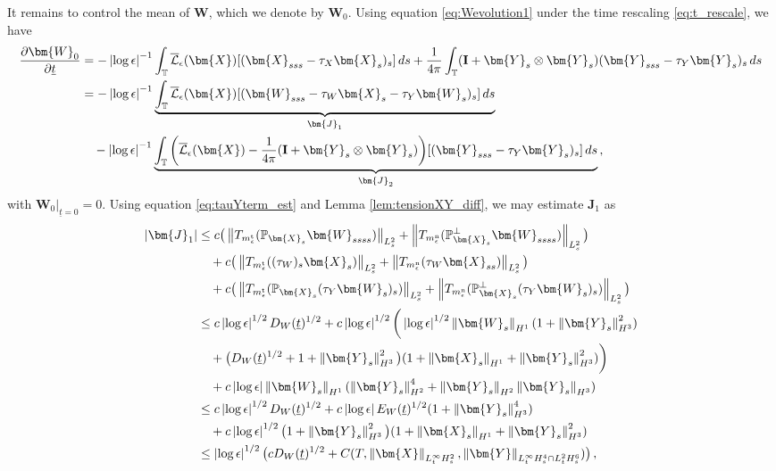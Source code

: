 \documentclass[11pt,reqno]{amsart}
\newcommand{\T}{\mathbb{T}}
\renewcommand{\P}{\mathbb{P}}
\newcommand{\X}{\bm{X}}
\newcommand{\Y}{\bm{Y}}
\newcommand{\p}{\partial}
\newcommand{\abs}[1]{\left\lvert #1 \right\rvert}
\newcommand{\norm}[1]{\left\lVert #1 \right\rVert}
\newcommand{\mc}[1]{\mathcal{#1}}
\numberwithin{equation}{section}
\theoremstyle{definition}
\begin{document}
It remains to control the mean of $\bm{W}$, which we denote by $\bm{W}_0$. Using equation \eqref{eq:Wevolution1} under the time rescaling \eqref{eq:t_rescale}, we have
\begin{equation}
\begin{aligned}
  \frac{\p\bm{W}_0}{\p \underline{t}} &= -\abs{\log\epsilon}^{-1}\int_\T\overline{\mc{L}}_\epsilon(\X)[(\X_{sss}-\tau_X\X_s)_s]\,ds
  + \frac{1}{4\pi}\int_\T ({\bf I}+\Y_s\otimes\Y_s)(\Y_{sss}-\tau_Y\Y_s)_s\,ds\\
  &= -\abs{\log\epsilon}^{-1}\underbrace{\int_\T\overline{\mc{L}}_\epsilon(\X)[(\bm{W}_{sss}-\tau_W\X_s-\tau_Y\bm{W}_s)_s]\,ds}_{\bm{J}_1}\\
  &\quad -\abs{\log\epsilon}^{-1}\underbrace{\int_\T\bigg(\overline{\mc{L}}_\epsilon(\X)-\frac{1}{4\pi}({\bf I}+\Y_s\otimes\Y_s)\bigg)[(\Y_{sss} -\tau_Y\Y_s)_s]\,ds}_{\bm{J}_2}\,,
\end{aligned}
\end{equation}
with $\bm{W}_0\big|_{\underline{t}=0}=0$. Using equation \eqref{eq:tauYterm_est} and Lemma \ref{lem:tensionXY_diff}, we may estimate $\bm{J}_1$ as 
\begin{equation}
\begin{aligned}
  \abs{\bm{J}_1} &\le c\big(\norm{T_{m_\epsilon^{\rm t}}(\P_{\X_s}\bm{W}_{ssss})}_{L^2_s} + \norm{T_{m_\epsilon^{\rm n}}(\P_{\X_s}^\perp\bm{W}_{ssss})}_{L^2_s}\big)\\
  &\quad + c\big(\norm{T_{m_\epsilon^{\rm t}}((\tau_W)_s\X_s)}_{L^2_s} + \norm{T_{m_\epsilon^{\rm n}}(\tau_W\X_{ss})}_{L^2_s}\big)\\
  &\quad + c\big(\norm{T_{m_\epsilon^{\rm t}}(\P_{\X_s}(\tau_Y\bm{W}_s)_s)}_{L^2_s} + \norm{T_{m_\epsilon^{\rm n}}(\P_{\X_s}^\perp(\tau_Y\bm{W}_s)_s)}_{L^2_s}\big)\\
  &\le c\abs{\log\epsilon}^{1/2}D_W(\underline{t})^{1/2}
  + c\abs{\log\epsilon}^{1/2}\bigg(\abs{\log\epsilon}^{1/2}\norm{\bm{W}_s}_{H^1}(1+\norm{\Y_s}_{H^3}^2)\\
  &\quad + \big(D_W(\underline{t})^{1/2} + 1 +\norm{\Y_s}_{H^3}^2\big)(1+\norm{\X_s}_{H^1}+\norm{\Y_s}_{H^3}^2)\bigg)\\
  &\quad + c\abs{\log\epsilon}\norm{\bm{W}_s}_{H^1}(\norm{\Y_s}_{H^2}^4+\norm{\Y_s}_{H^2}\norm{\Y_s}_{H^3})\\
  &\le c\abs{\log\epsilon}^{1/2}D_W(\underline{t})^{1/2}
  + c\abs{\log\epsilon}E_W(\underline{t})^{1/2}(1+\norm{\Y_s}_{H^3}^4)\\
  &\quad + c\abs{\log\epsilon}^{1/2}\big(1 +\norm{\Y_s}_{H^3}^2\big)(1+\norm{\X_s}_{H^1}+\norm{\Y_s}_{H^3}^2)\\
  &\le \abs{\log\epsilon}^{1/2}\big(cD_W(\underline{t})^{1/2}+C(T,\norm{\X}_{L^\infty_tH^2_s},\norm{\Y}_{L^\infty_tH^4_s\cap L^2_tH^6_s}) \big)\,,
\end{aligned}
\end{equation}
\end{document}
